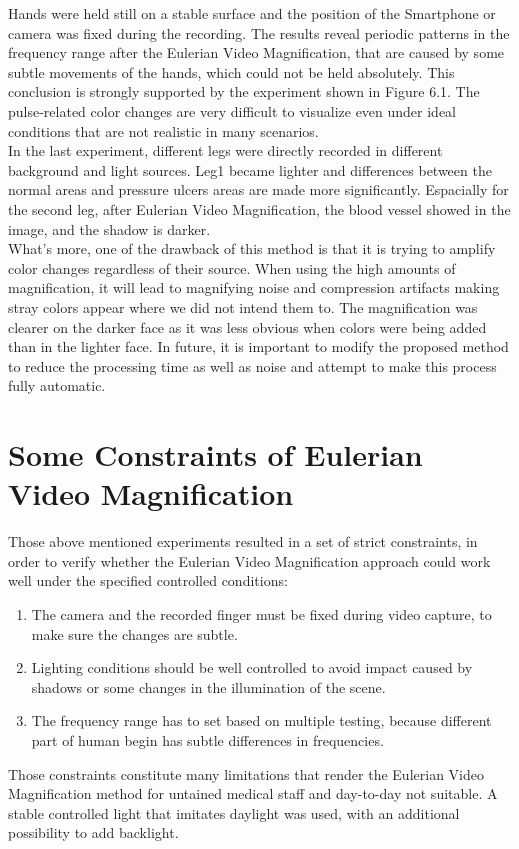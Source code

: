 Hands were held still on a stable surface and the position of the Smartphone or camera was fixed during the recording. The results reveal periodic patterns in the frequency range after the Eulerian Video Magnification, that are caused by some subtle movements of the hands, which could not be held absolutely. This conclusion is strongly supported by the experiment shown in Figure 6.1. The pulse-related color changes are very difficult to visualize even under ideal conditions that are not realistic in many scenarios.\\

In the last experiment, different legs were directly recorded in different background and light sources. Leg1 became lighter and differences between the normal areas and pressure ulcers areas are made more significantly. Espacially for the second leg, after Eulerian Video Magnification, the blood vessel showed in the image, and the shadow is darker. \\

What's more, one of the drawback of this method is that it is trying to amplify color changes regardless of their source. When using the high amounts of magnification, it will lead to magnifying noise and compression artifacts making stray colors appear where we did not intend them to. The magnification was clearer on the darker face as it was less obvious when colors were being added than in the lighter face. In future, it is important to modify the proposed method to reduce the processing time as well as noise and attempt to make this process fully automatic.\\

\section{Some Constraints of Eulerian Video Magnification}
Those above mentioned experiments resulted in a set of strict constraints, in order to verify whether the Eulerian Video Magnification approach could work well under the specified controlled conditions:
\begin{enumerate}
    \item The camera and the recorded finger must be fixed during video capture, to make sure the changes are subtle.
    \item Lighting conditions should be well controlled to avoid impact caused by shadows or some changes in the illumination of the scene.
    \item The frequency range has to set based on multiple testing, because different part of human begin has subtle differences in frequencies.
\end{enumerate}
Those constraints constitute many limitations that render the Eulerian Video Magnification method for untained medical staff and day-to-day not suitable. A stable controlled light that imitates daylight was used, with an additional possibility to add backlight. \\

